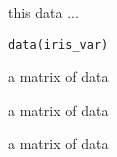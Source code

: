 \begin{Description}\relax
this data ...
\end{Description}
\begin{Usage}
\begin{verbatim}data(iris_var)\end{verbatim}
\end{Usage}
\begin{Format}\relax
a matrix of data
\end{Format}
\begin{Source}\relax
a matrix of data
\end{Source}
\begin{References}\relax
a matrix of data
\end{References}

